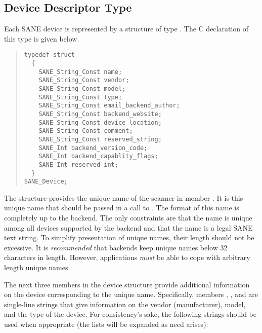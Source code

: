 \documentclass[11pt,DVIps]{report}
\begin{document}
\subsection{Device Descriptor Type}
\begin{changebar}

Each SANE device is represented by a structure of type
.  The C declaration of this type is given
below.
\begin{quote}
\begin{verbatim}
typedef struct
  {
    SANE_String_Const name;
    SANE_String_Const vendor;
    SANE_String_Const model;
    SANE_String_Const type;
    SANE_String_Const email_backend_author;
    SANE_String_Const backend_website;
    SANE_String_Const device_location;
    SANE_String_Const comment;
    SANE_String_Const reserved_string;
    SANE_Int backend_version_code;
    SANE_Int backend_capablity_flags;
    SANE_Int reserved_int;
  }
SANE_Device;
\end{verbatim}
\end{quote}
\end{changebar}
The structure provides the unique name of the scanner in member
.  It is this unique name that should be passed in a call
to .  The format of this name is completely up to
the backend.  The only constraints are that the name is unique among
all devices supported by the backend and that the name is a legal SANE
text string.  To simplify presentation of unique names, their length
should not be excessive.  It is {\em recommended\/} that backends keep
unique names below 32 characters in length.  However, applications
{\em must\/} be able to cope with arbitrary length unique names.

The next three members in the device structure provide additional
information on the device corresponding to the unique name.
Specifically, members , , and  are
single-line strings that give information on the vendor
(manufacturer), model, and the type of the device.  For consistency's
sake, the following strings should be used when appropriate (the lists
will be expanded as need arises):
\end{document}
